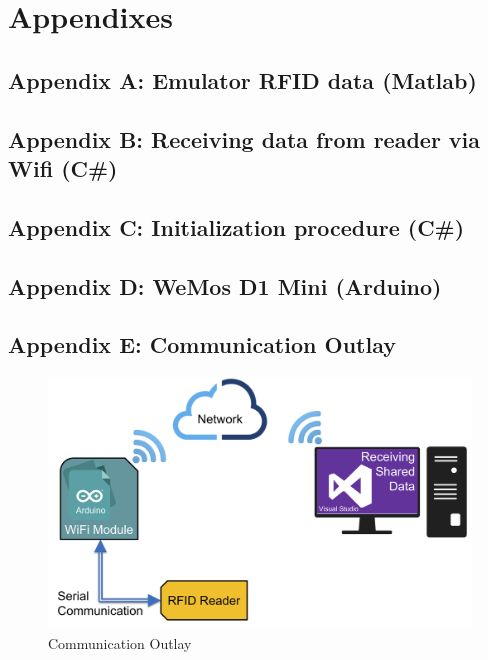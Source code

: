 \section{Appendixes}

\subsection{Appendix A: Emulator RFID data (Matlab)}\label{Sec_AppA}
\scriptsize


\subsection{Appendix B: Receiving data from reader via Wifi (C\#)}\label{Sec_AppB}
\scriptsize


\pagebreak
\subsection{Appendix C: Initialization procedure (C\#)}\label{Sec_AppC}
\scriptsize


\pagebreak
\subsection{Appendix D: WeMos D1 Mini (Arduino)}\label{Sec_AppD}
\scriptsize

\pagebreak

\subsection{Appendix E: Communication Outlay}\label{Sec_AppE}
\begin{figure}[!htbp]
	\centering
	\includegraphics[width = 15cm]{Pictures/communication}
	\caption{Communication Outlay}
	\label{com}
\end{figure}
\pagebreak